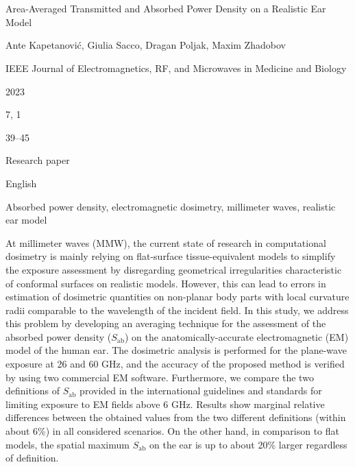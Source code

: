 \cleardoublepage

\chapter{}
\label{chap:c}

\begin{description}[leftmargin=!,labelwidth=\widthof{\bfseries Volume and number}]
    \item[Title] Area-Averaged Transmitted and Absorbed Power Density on a Realistic Ear Model
    \item[Authors] Ante Kapetanović, Giulia Sacco, Dragan Poljak, Maxim Zhadobov
    \item[Journal] IEEE Journal of Electromagnetics, RF, and Microwaves in Medicine and Biology
    \item[Year] 2023
    \item[Volume and number] 7, 1
    \item[Pages] 39--45
    \item[Categorization] Research paper
    \item[Language] English
    \item[Keywords] Absorbed power density, electromagnetic dosimetry, millimeter waves, realistic ear model
    \item[Abstract] At millimeter waves (MMW), the current state of research in computational dosimetry is mainly relying on flat-surface tissue-equivalent models to simplify the exposure assessment by disregarding geometrical irregularities characteristic of conformal surfaces on realistic models.
    However, this can lead to errors in estimation of dosimetric quantities on non-planar body parts with local curvature radii comparable to the wavelength of the incident field.
    In this study, we address this problem by developing an averaging technique for the assessment of the absorbed power density ($S_\text{ab}$) on the anatomically-accurate electromagnetic (EM) model of the human ear.
    The dosimetric analysis is performed for the plane-wave exposure at 26 and 60 GHz, and the accuracy of the proposed method is verified by using two commercial EM software. Furthermore, we compare the two definitions of $S_\text{ab}$ provided in the international guidelines and standards for limiting exposure to EM fields above 6 GHz.
    Results show marginal relative differences between the obtained values from the two different definitions (within about 6\%) in all considered scenarios.
    On the other hand, in comparison to flat models, the spatial maximum $S_\text{ab}$ on the ear is up to about 20\% larger regardless of definition.

\end{description}
